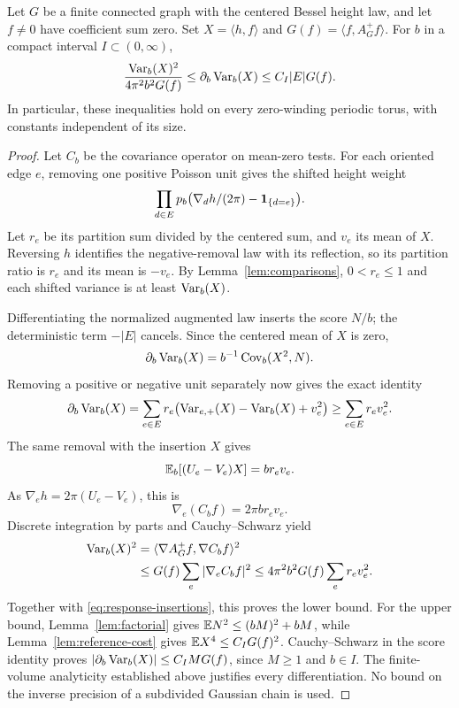 \begin{lemma}\label{lem:response}
Let $G$ be a finite connected graph with the centered Bessel height law,
and let $f\ne0$ have coefficient sum zero.  Set
$X=\langle h,f\rangle$ and $G(f)=\langle f,A_G^+f\rangle$.
For $b$ in a compact interval $I\subset(0,\infty)$,
\begin{equation}\label{eq:temperature-response}
 \frac{\operatorname{Var}_b(X)^2}{4\pi^2b^2G(f)}
       \le \partial_b\operatorname{Var}_b(X)
       \le C_I|E|G(f).
\end{equation}
In particular, these inequalities hold on every zero-winding periodic
torus, with constants independent of its size.
\end{lemma}

\begin{proof}
Let $C_b$ be the covariance operator on mean-zero tests.  For each
oriented edge $e$, removing one positive Poisson unit gives the shifted
height weight
\[
 \prod_{d\in E}p_b\bigl(\nabla_dh/(2\pi)-\mathbf 1_{\{d=e\}}\bigr).
\]
Let $r_e$ be its partition sum divided by the centered sum, and $v_e$
its mean of $X$.  Reversing $h$ identifies the negative-removal law with
its reflection, so its partition ratio is $r_e$ and its mean is $-v_e$.
By Lemma~\ref{lem:comparisons}, $0<r_e\le1$ and each shifted variance
is at least $\operatorname{Var}_b(X)$.

Differentiating the normalized augmented law inserts the score $N/b$;
the deterministic term $-|E|$ cancels.  Since the centered mean of $X$
is zero,
\[
 \partial_b\operatorname{Var}_b(X)=b^{-1}\operatorname{Cov}_b(X^2,N).
\]
Removing a positive or negative unit separately now gives the exact
identity
\begin{equation}\label{eq:response-insertions}
 \partial_b\operatorname{Var}_b(X)
   =\sum_{e\in E}r_e\bigl(\operatorname{Var}_{e,+}(X)-\operatorname{Var}_b(X)+v_e^2\bigr)
   \ge\sum_{e\in E}r_ev_e^2.
\end{equation}
The same removal with the insertion $X$ gives
\[
 \mathbb E_b[(U_e-V_e)X]=br_ev_e.
\]
As $\nabla_eh=2\pi(U_e-V_e)$, this is
\begin{equation}\label{eq:response-gradient}
                    \nabla_e(C_bf)=2\pi br_ev_e.
\end{equation}
Discrete integration by parts and Cauchy--Schwarz yield
\[
 \begin{split}
 \operatorname{Var}_b(X)^2
 &=\langle\nabla A_G^+f,\nabla C_bf\rangle^2\\
 &\le G(f)\sum_e|\nabla_eC_bf|^2
 \le4\pi^2b^2G(f)\sum_er_ev_e^2.
 \end{split}
\]
Together with \eqref{eq:response-insertions}, this proves the lower
bound.  For the upper bound, Lemma~\ref{lem:factorial} gives
$\mathbb E N^2\le(bM)^2+bM$, while
Lemma~\ref{lem:reference-cost} gives $\mathbb E X^4\le C_IG(f)^2$.
Cauchy--Schwarz in the score identity proves
$|\partial_b\operatorname{Var}_b(X)|\le C_IMG(f)$, since $M\ge1$ and $b\in I$.
The finite-volume analyticity established above justifies every
differentiation.  No bound on the inverse precision of a subdivided
Gaussian chain is used.
\end{proof}
